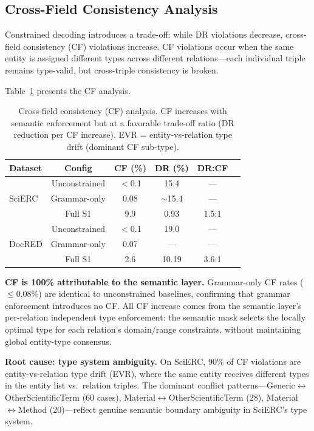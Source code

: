 \documentclass[11pt,a4paper]{article}
\begin{document}
\subsection{Cross-Field Consistency Analysis}
\label{sec:cf}

Constrained decoding introduces a trade-off: while DR violations decrease, cross-field consistency (CF) violations increase.
CF violations occur when the same entity is assigned different types across different relations---each individual triple remains type-valid, but cross-triple consistency is broken.

Table~\ref{tab:cf} presents the CF analysis.

\begin{table}[t]
\centering
\small
\caption{Cross-field consistency (CF) analysis. CF increases with semantic enforcement but at a favorable trade-off ratio (DR reduction per CF increase). EVR = entity-vs-relation type drift (dominant CF sub-type).}
\label{tab:cf}
\begin{tabular}{lccccc}
\toprule
\textbf{Dataset} & \textbf{Config} & \textbf{CF (\%)} & \textbf{DR (\%)} & \textbf{DR:CF} \\
\midrule
\multirow{3}{*}{SciERC}
& Unconstrained & $<$0.1 & 15.4 & --- \\
& Grammar-only  & 0.08   & $\sim$15.4 & --- \\
& Full S1       & 9.9    & 0.93 & 1.5:1 \\
\midrule
\multirow{3}{*}{DocRED}
& Unconstrained & $<$0.1 & 19.0 & --- \\
& Grammar-only  & 0.07   & ---  & --- \\
& Full S1       & 2.6    & 10.19 & 3.6:1 \\
\bottomrule
\end{tabular}
\end{table}

\textbf{CF is 100\% attributable to the semantic layer.}
Grammar-only CF rates ($\leq$0.08\%) are identical to unconstrained baselines, confirming that grammar enforcement introduces no CF.
All CF increase comes from the semantic layer's per-relation independent type enforcement: the semantic mask selects the locally optimal type for each relation's domain/range constraints, without maintaining global entity-type consensus.

\textbf{Root cause: type system ambiguity.}
On SciERC, 90\% of CF violations are entity-vs-relation type drift (EVR), where the same entity receives different types in the entity list vs.\ relation triples.
The dominant conflict patterns---Generic$\leftrightarrow$OtherScientificTerm (60 cases), Material$\leftrightarrow$OtherScientificTerm (28), Material$\leftrightarrow$Method (20)---reflect genuine semantic boundary ambiguity in SciERC's type system.
\end{document}

